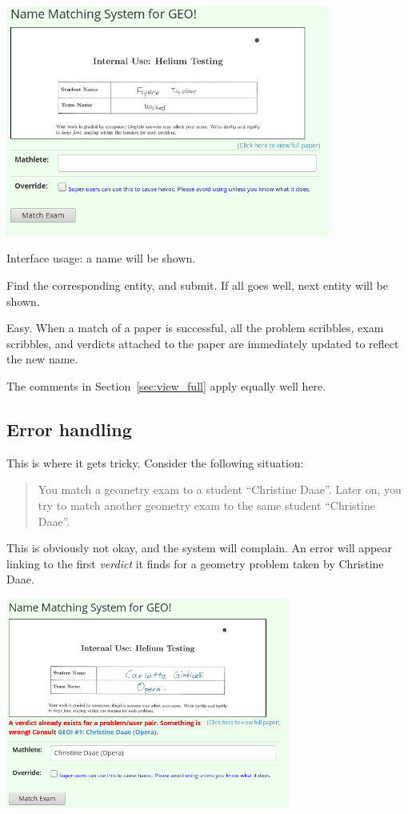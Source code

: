 \begin{center}
	\includegraphics[width=0.8\textwidth]{images/papermatch.png}
\end{center}

Interface usage: a name will be shown.
\begin{itemize}
	\ii Find the corresponding entity, and submit.
	\ii If all goes well, next entity will be shown.
\end{itemize}
Easy.
When a match of a paper is successful,
all the problem scribbles, exam scribbles, and verdicts
attached to the paper are immediately updated to reflect the new name.

The comments in Section~\ref{sec:view_full} apply equally well here.

\subsection{Error handling}
This is where it gets tricky.
Consider the following situation:
\begin{quote}
	You match a geometry exam to a student ``Christine Daae''.  
	Later on, you try to match another geometry exam
	to the same student ``Christine Daae''.
\end{quote}
This is obviously not okay, and the system will complain.
An error will appear linking to the first \emph{verdict}
it finds for a geometry problem taken by Christine Daae.

\begin{center}
	\includegraphics[width=0.7\textwidth]{images/matchconflict.png}
\end{center}

